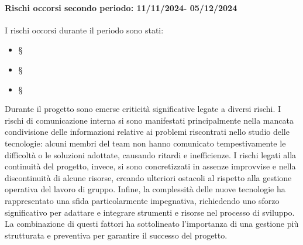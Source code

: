 \paragraph{Rischi occorsi secondo periodo: 11/11/2024- 05/12/2024}
I rischi occorsi durante il periodo sono stati:
\begin{itemize}
    \item \S{}
    \item \S{}
    \item \S{}
\end{itemize}Durante il progetto sono emerse criticità significative legate a diversi rischi. I rischi di comunicazione interna si sono manifestati principalmente nella mancata condivisione delle informazioni relative ai problemi riscontrati nello studio delle tecnologie: alcuni membri del team non hanno comunicato tempestivamente le difficoltà o le soluzioni adottate, causando ritardi e inefficienze.
I rischi legati alla continuità del progetto, invece, si sono concretizzati in assenze improvvise e nella discontinuità di alcune risorse, creando ulteriori ostacoli al rispetto alla gestione operativa del lavoro di gruppo.
Infine, la complessità delle nuove tecnologie ha rappresentato una sfida particolarmente impegnativa, richiedendo uno sforzo significativo per adattare e integrare strumenti e risorse nel processo di sviluppo. La combinazione di questi fattori ha sottolineato l'importanza di una gestione più strutturata e preventiva per garantire il successo del progetto.



